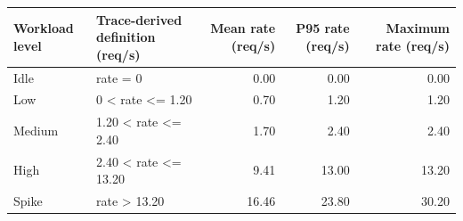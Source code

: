 \begin{tabular}{llrrr}
\toprule
Workload level & Trace-derived definition (req/s) & Mean rate (req/s) & P95 rate (req/s) & Maximum rate (req/s) \\
\midrule
Idle & rate = 0 & 0.00 & 0.00 & 0.00 \\
Low & 0 < rate <= 1.20 & 0.70 & 1.20 & 1.20 \\
Medium & 1.20 < rate <= 2.40 & 1.70 & 2.40 & 2.40 \\
High & 2.40 < rate <= 13.20 & 9.41 & 13.00 & 13.20 \\
Spike & rate > 13.20 & 16.46 & 23.80 & 30.20 \\
\bottomrule
\end{tabular}
